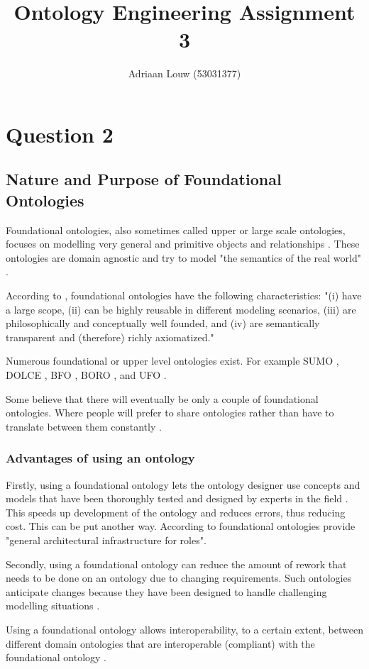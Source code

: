 \documentclass[12pt,a4paper]{article}
\title{Ontology Engineering Assignment 3}
\author{Adriaan Louw (53031377)}
\begin{document}
\section{Question 2}

\subsection{Nature and Purpose of Foundational Ontologies}

Foundational ontologies, also sometimes called upper or large scale ontologies, focuses on modelling very general and primitive objects and relationships \citep{dolce}. These ontologies are domain agnostic and try to model "the semantics of the real world" \citep{Conesa2010}.

According to \cite{dolce}, foundational ontologies have the following characteristics: "(i) have a large scope, (ii) can be highly reusable in different modeling scenarios, (iii) are philosophically and conceptually well founded, and (iv) are semantically transparent and (therefore) richly axiomatized."

Numerous foundational or upper level ontologies exist. For example
SUMO \citep{sumo},
DOLCE \citep{dolce},
BFO \citep{BFO},
BORO \citep{DeCesare},
and UFO \citep{DeCesare}.

Some believe that there will eventually be only a couple of foundational ontologies. Where people will prefer to share ontologies rather than have to translate between them constantly \citep{sumo}.

\subsubsection{Advantages of using an ontology}

Firstly, using a foundational ontology lets the ontology designer use concepts and models that have been thoroughly tested and designed by experts in the field \citep{sumo}. This speeds up development of the ontology and reduces errors, thus reducing cost. This can be put another way. According to \cite{DeCesare} foundational ontologies provide "general architectural infrastructure for roles".

Secondly, using a foundational ontology can reduce the amount of rework that needs to be done on an ontology due to changing requirements. Such ontologies anticipate changes because they have been designed to handle challenging modelling situations \citep{sumo}.

Using a foundational ontology allows interoperability, to a certain extent, between different domain ontologies that are interoperable (compliant) with the foundational ontology \citep{Niles2001}.
\end{document}
